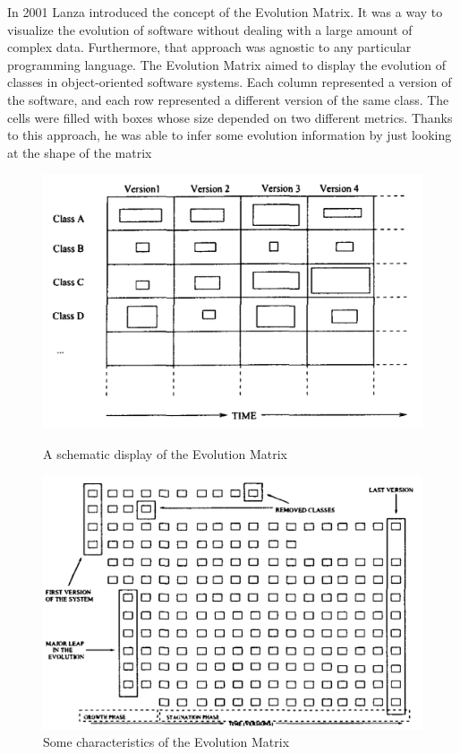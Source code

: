 In 2001 Lanza \cite{Lanza2001} introduced the concept of the Evolution Matrix. It was a way to visualize the evolution of software without dealing with a large amount of complex data. 
Furthermore, that approach was agnostic to any particular programming language. The Evolution Matrix aimed to display the evolution of classes in object-oriented software systems. 
Each column represented a version of the software, and each row represented a different version of the same class. The cells were filled with boxes whose size depended on two different metrics. 
Thanks to this approach, he was able to infer some evolution information by just looking at the shape of the matrix

\begin{figure}[H]
  \includegraphics[width=\linewidth]{EvolutionMatrix1.png}
  \caption{A schematic display of the Evolution Matrix}
\endminipage\hfill
{}
  \includegraphics[width=\linewidth]{EvolutionMatrix2.png}
  \caption{Some characteristics of the Evolution Matrix}
\endminipage\hfill
\end{figure}

